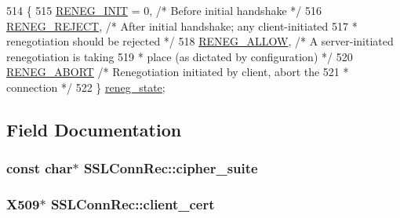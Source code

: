 \begin{DoxyCode}
514          \{
515         \hyperlink{structSSLConnRec_af7ee32568a28fd0e490ccf301cb6ed0caf04db4f4ad06eb4059512dd7290dc923}{RENEG\_INIT} = 0, \textcolor{comment}{/* Before initial handshake */}
516         \hyperlink{structSSLConnRec_af7ee32568a28fd0e490ccf301cb6ed0ca949d188d9ba39b42e7f0b89dccb7cfd0}{RENEG\_REJECT},   \textcolor{comment}{/* After initial handshake; any client-initiated}
517 \textcolor{comment}{                         * renegotiation should be rejected */}
518         \hyperlink{structSSLConnRec_af7ee32568a28fd0e490ccf301cb6ed0ca43decdf6afe45cf205c25ebb194cab87}{RENEG\_ALLOW},    \textcolor{comment}{/* A server-initiated renegotiation is taking}
519 \textcolor{comment}{                         * place (as dictated by configuration) */}
520         \hyperlink{structSSLConnRec_af7ee32568a28fd0e490ccf301cb6ed0ca93c1406266f4b6c2d9feef4ab5dedbfe}{RENEG\_ABORT}     \textcolor{comment}{/* Renegotiation initiated by client, abort the}
521 \textcolor{comment}{                         * connection */}
522     \} \hyperlink{structSSLConnRec_ad36678f508db0c5a628b6a99a76bf3c0}{reneg\_state};
\end{DoxyCode}


\subsection{Field Documentation}
\subsubsection[{\texorpdfstring{cipher\+\_\+suite}{cipher_suite}}]{\setlength{\rightskip}{0pt plus 5cm}const char$\ast$ S\+S\+L\+Conn\+Rec\+::cipher\+\_\+suite}\hypertarget{structSSLConnRec_ad05c2c70b3f1febdee2a34ca0dbb79fb}{}\label{structSSLConnRec_ad05c2c70b3f1febdee2a34ca0dbb79fb}
\subsubsection[{\texorpdfstring{client\+\_\+cert}{client_cert}}]{\setlength{\rightskip}{0pt plus 5cm}X509$\ast$ S\+S\+L\+Conn\+Rec\+::client\+\_\+cert}\hypertarget{structSSLConnRec_a99340dc58baeb852d8945f614b813ea2}{}\label{structSSLConnRec_a99340dc58baeb852d8945f614b813ea2}
